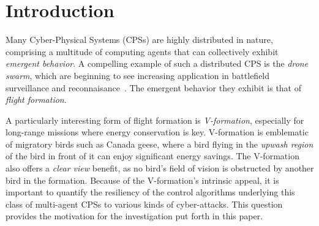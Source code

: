 \section{Introduction}
\label{sec:intro}



Many Cyber-Physical Systems (CPSs) are highly distributed in nature, comprising a multitude of computing agents that can collectively exhibit \emph{emergent behavior}. A compelling example of such a distributed CPS is the \emph{drone swarm}, which are beginning to see increasing application in battlefield surveillance and reconnaisance~\cite{droneswarm}.  The emergent behavior they exhibit is that of \emph{flight formation}.

A particularly interesting form of flight formation is \emph{V-formation}, especially for long-range missions where energy conservation is key.  V-formation is emblematic of migratory birds such as Canada geese, where a bird flying in the \emph{upwash region} of the bird in front of it can enjoy significant energy savings.  The V-formation also offers a \emph{clear view} benefit, as no bird's field of vision is obstructed by another bird in the formation.  Because of the V-formation's intrinsic appeal, it is important to quantify the resiliency of the control algorithms underlying this class of multi-agent CPSs to various kinds of cyber-attacks.  This question provides the motivation for the investigation put forth in this paper.


